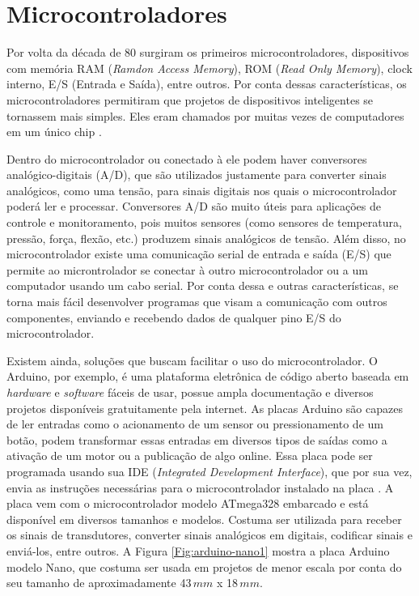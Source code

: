 \documentclass[
	12pt,				%
	openright,			%
	oneside,			%
	a4paper,			%
	english,			%
	brazil				%
	]{abntex2}
\begin{document}
		\section{Microcontroladores}

		Por volta da década de 80 surgiram os primeiros microcontroladores, dispositivos com memória RAM (\textit{Ramdon Access Memory}), ROM (\textit{Read Only Memory}), clock interno, E/S (Entrada e Saída), entre outros. Por conta dessas características, os microcontroladores permitiram que projetos de dispositivos inteligentes se tornassem mais simples. Eles eram chamados por muitas vezes de computadores em um único chip \cite{pereiramicrocontroladores}. 

		Dentro do microcontrolador ou conectado à ele podem haver conversores analógico-digitais (A/D), que são utilizados justamente para converter sinais analógicos, como uma tensão, para sinais digitais nos quais o microcontrolador poderá ler e processar. Conversores A/D são muito úteis para aplicações de controle e monitoramento, pois muitos sensores (como sensores de temperatura, pressão, força, flexão, etc.) produzem sinais analógicos de tensão. Além disso, no microcontrolador existe uma comunicação serial de entrada e saída (E/S) que permite ao microntrolador se conectar à outro microcontrolador ou a um computador usando um cabo serial. Por conta dessa e outras características, se torna mais fácil desenvolver programas que visam a comunicação com outros componentes, enviando e recebendo dados de qualquer pino E/S do microcontrolador. \cite{ibrahim2011advanced}

		Existem ainda, soluções que buscam facilitar o uso do microcontrolador. O Arduino, por exemplo, é uma plataforma eletrônica de código aberto baseada em \textit{hardware} e \textit{software} fáceis de usar, possue ampla documentação e diversos projetos disponíveis gratuitamente pela internet. As placas Arduino são capazes de ler entradas como o acionamento de um sensor ou pressionamento de um botão, podem transformar essas entradas em diversos tipos de saídas como a ativação de um motor ou a publicação de algo online. Essa placa pode ser programada usando sua IDE (\textit{Integrated Development Interface}), que por sua vez, envia as instruções necessárias para o microcontrolador instalado na placa \cite{arduinosite}. A placa vem com o microcontrolador modelo ATmega328 embarcado e está disponível em diversos tamanhos e modelos. Costuma ser utilizada para receber os sinais de transdutores, converter sinais analógicos em digitais, codificar sinais e enviá-los, entre outros. A Figura \ref{Fig:arduino-nano1} mostra a placa Arduino modelo Nano, que costuma ser usada em projetos de menor escala por conta do seu tamanho de aproximadamente 43$\,mm$ x 18$\,mm$.
	
\end{document}
